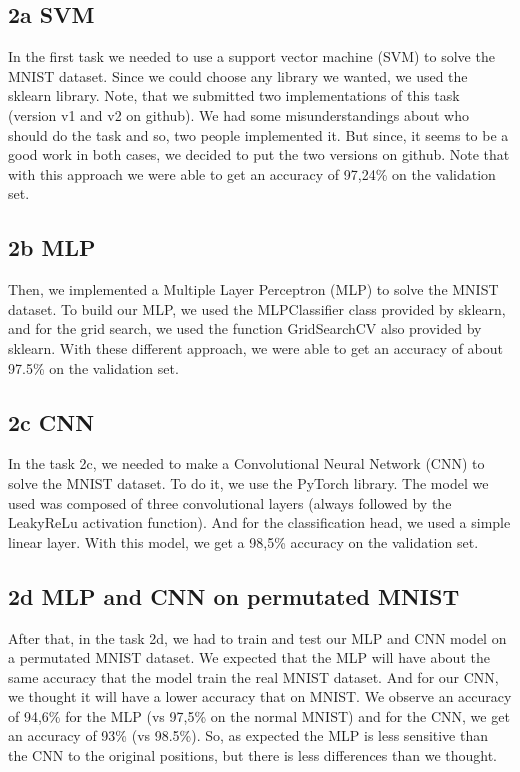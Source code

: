 \documentclass[12pt]{article}
\begin{document}
\subsection*{2a SVM}
In the first task we needed to use a support vector machine (SVM) to solve the MNIST dataset. Since we could choose any library we wanted, we used the sklearn library. Note, that we submitted two implementations of this task (version v1 and v2 on github). We had some misunderstandings about who should do the task and so, two people implemented it. But since, it seems to be a good work in both cases, we decided to put the two versions on github. Note that with this approach we were able to get an accuracy of 97,24\% on the validation set.
\subsection*{2b MLP}
Then, we implemented a Multiple Layer Perceptron (MLP) to solve the MNIST dataset. To build our MLP, we used the MLPClassifier class provided by sklearn, and for the grid search, we used the function GridSearchCV also provided by sklearn. With these different approach, we were able to get an accuracy of about 97.5\% on the validation set.
\subsection*{2c CNN}
In the task 2c, we needed to make a Convolutional Neural Network (CNN) to solve the MNIST dataset. To do it, we use the PyTorch library. The model we used was composed of three convolutional layers (always followed by the LeakyReLu activation function). And for the classification head, we used a simple linear layer.
With this model, we get a 98,5\% accuracy on the validation set.
\subsection*{2d MLP and CNN on permutated MNIST}
After that, in the task 2d, we had to train and test our MLP and CNN model on a permutated MNIST dataset. We expected that the MLP will have about the same accuracy that the model train  the real MNIST dataset. And for our CNN, we thought it will have a lower accuracy that on MNIST.
\newline We observe an accuracy of 94,6\% for the MLP (vs 97,5\% on the normal MNIST) and for the CNN, we get an accuracy of 93\% (vs 98.5\%). So, as expected the MLP is less sensitive than the CNN to the original positions, but there is less differences than we thought.
\end{document}
